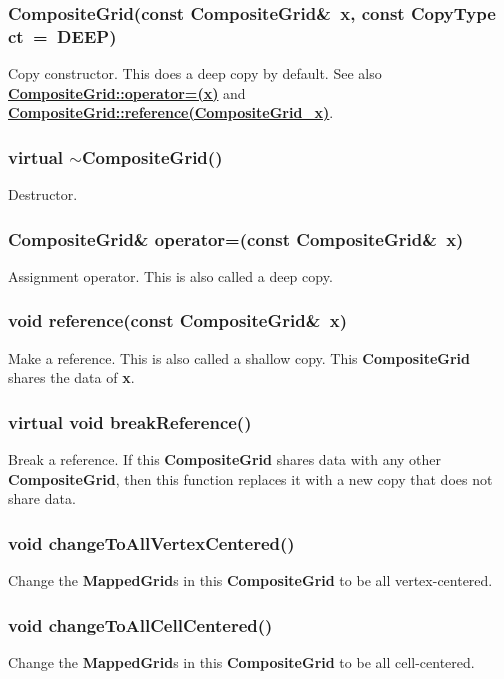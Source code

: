 \documentclass{article}
\begin{document}
  \subsubsection{CompositeGrid(const CompositeGrid\&~x, const CopyType ct~=~DEEP)}
  \label{CompositeGrid::CompositeGrid(x,ct)}
    Copy constructor.  This does a deep copy by default.
    See also {\bf{}\hyperref{operator=(x)}{operator=(x) \rm(\S}{)}{CompositeGrid::operator=(x)}}
    and {\bf{}\hyperref{reference(x)}{reference(x) \rm(\S}{)}{CompositeGrid::reference(CompositeGrid_x)}}.

  \subsubsection{virtual $\sim$CompositeGrid()}
  \label{CompositeGrid::tilde_CompositeGrid()}
    Destructor.

  \subsubsection{CompositeGrid\& operator=(const CompositeGrid\&~x)}
  \label{CompositeGrid::operator=(x)}
    Assignment operator.  This is also called a deep copy.

  \subsubsection{void reference(const CompositeGrid\&~x)}
  \label{CompositeGrid::reference(CompositeGrid_x)}
    Make a reference.  This is also called a shallow copy.  This \textbf{CompositeGrid} shares the data of \textbf{x}.

  \subsubsection{virtual void breakReference()}
  \label{CompositeGrid::breakReference()}
    Break a reference.  If this \textbf{CompositeGrid} shares data with any other \textbf{CompositeGrid},
    then this function replaces it with a new copy that does not share data.

  \subsubsection{void changeToAllVertexCentered()}
  \label{CompositeGrid::changeToAllVertexCentered()}
    Change the \textbf{MappedGrid}s in this \textbf{CompositeGrid} to be all vertex-centered.

  \subsubsection{void changeToAllCellCentered()}
  \label{CompositeGrid::changeToAllCellCentered()}
    Change the \textbf{MappedGrid}s in this \textbf{CompositeGrid} to be all cell-centered.
\end{document}
